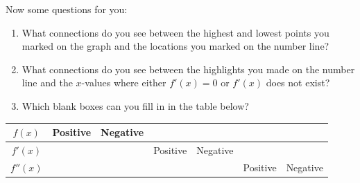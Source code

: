 \begin{minipage}{0.5\textwidth-1em}

\vspace{5ex}

\signchart
\end{minipage}
\hfill%
\begin{minipage}{0.5\textwidth-1em}

\vspace{5ex}

\signchart
\end{minipage}

\vfill

Now some questions for you:
\begin{enumerate}
    \item What connections do you see between the highest and lowest points you marked on the graph and the locations you marked on the number line?
    \item What connections do you see between the highlights you made on the number line and the $x$-values where either $f'(x) = 0$ or $f'(x)$ does not exist?
    \item Which blank boxes can you fill in in the table below?
\end{enumerate}
\def\arraystretch{1.5}
\begin{tabularx}{\textwidth}{|c|Y|Y|Y|Y|Y|Y|}\hline
    $f(x)$   & Positive & Negative &          &          &          &          \\\hline 
    $f'(x)$  &          &          & Positive & Negative &          &          \\\hline 
    $f''(x)$ &          &          &          &          & Positive & Negative \\\hline
\end{tabularx}

